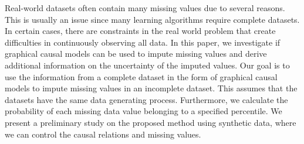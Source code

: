
Real-world datasets often contain many missing values due to several reasons. This is usually an issue since many learning algorithms require complete datasets. In certain cases, there are constraints in the real world problem that create difficulties in continuously observing all data. In this paper, we investigate if graphical causal models can be used to impute missing values and derive additional information on the uncertainty of the imputed values. Our goal is to use the information from a complete dataset in the form of graphical causal models to impute missing values in an incomplete dataset. This assumes that the datasets have the same data generating process. Furthermore, we calculate the probability of each missing data value belonging to a specified percentile. We present a preliminary study on the proposed method using synthetic data, where we can control the causal relations and missing values.

